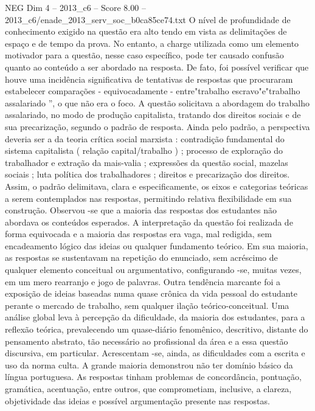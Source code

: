 \begin{textsample}{NEG Dim 4 – 2013\_c6 – Score 8.00 – 2013\_c6/enade\_2013\_serv\_soc\_b0ca85ce74.txt}
O nível de profundidade de conhecimento exigido na questão era alto tendo em vista as delimitações de espaço e de tempo da prova.
No entanto, a charge utilizada como um elemento motivador para a questão, nesse caso específico, pode ter causado confusão quanto ao conteúdo a ser abordado na resposta.
De fato, foi possível verificar que houve uma incidência significativa de tentativas de respostas que procuraram estabelecer comparações - equivocadamente - entre"trabalho escravo"e"trabalho assalariado ”, o que não era o foco.
A questão solicitava a abordagem do trabalho assalariado, no modo de produção capitalista, tratando dos direitos sociais e de sua precarização, segundo o padrão de resposta.
Ainda pelo padrão, a perspectiva deveria ser a da teoria crítica social marxista : contradição fundamental do sistema capitalista ( relação capital/trabalho ) ; processo de exploração do trabalhador e extração da mais-valia ; expressões da questão social, mazelas sociais ; luta política dos trabalhadores ; direitos e precarização dos direitos.
Assim, o padrão delimitava, clara e especificamente, os eixos e categorias teóricas a serem contemplados nas respostas, permitindo relativa flexibilidade em sua construção.
Observou -se que a maioria das respostas dos estudantes não abordava os conteúdos esperados.
A interpretação da questão foi realizada de forma equivocada e a maioria das respostas era vaga, mal redigida, sem encadeamento lógico das ideias ou qualquer fundamento teórico.
Em sua maioria, as respostas se sustentavam na repetição do enunciado, sem acréscimo de qualquer elemento conceitual ou argumentativo, configurando -se, muitas vezes, em um mero rearranjo e jogo de palavras.
Outra tendência marcante foi a exposição de ideias baseadas numa quase crônica da vida pessoal do estudante perante o mercado de trabalho, sem qualquer ilação teórico-conceitual.
Uma análise global leva à percepção da dificuldade, da maioria dos estudantes, para a reflexão teórica, prevalecendo um quase-diário fenomênico, descritivo, distante do pensamento abstrato, tão necessário ao profissional da área e a essa questão discursiva, em particular.
Acrescentam -se, ainda, as dificuldades com a escrita e uso da norma culta.
A grande maioria demonstrou não ter domínio básico da língua portuguesa.
As respostas tinham problemas de concordância, pontuação, gramática, acentuação, entre outros, que comprometiam, inclusive, a clareza, objetividade das ideias e possível argumentação presente nas respostas.

\end{textsample}
